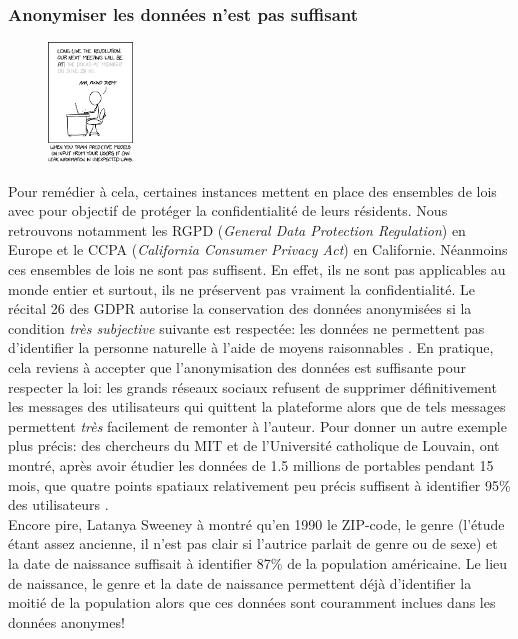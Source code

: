 \subsubsection{Anonymiser les données n'est pas suffisant}


\begin{figure}
    \centering
    \includegraphics[width=0.20\textwidth, clip]{"./proofs/source/predictive_models.png"}
\end{figure}


Pour remédier à cela, certaines instances mettent en place des ensembles de lois avec pour objectif de protéger la confidentialité de leurs résidents. Nous retrouvons notamment les RGPD (\textit{General Data Protection Regulation}) en Europe et le CCPA (\textit{California Consumer Privacy Act}) en Californie. Néanmoins ces ensembles de lois ne sont pas suffisent. En effet, ils ne sont pas applicables au monde entier et surtout, ils ne préservent pas vraiment la confidentialité. Le récital 26 des GDPR autorise la conservation des données anonymisées si la condition \textit{très subjective} suivante est respectée: les données ne permettent pas d'identifier la personne naturelle à l'aide de moyens raisonnables \cite{rec26}. En pratique, cela reviens à accepter que l'anonymisation des données est suffisante pour respecter la loi: les grands réseaux sociaux refusent de supprimer définitivement les messages des utilisateurs qui quittent la plateforme alors que de tels messages permettent \textit{très} facilement de remonter à l'auteur. Pour donner un autre exemple plus précis: des chercheurs du MIT et de l'Université catholique de Louvain, ont montré, après avoir étudier les données de 1.5 millions de portables pendant 15 mois, que quatre points spatiaux relativement peu précis suffisent à identifier 95\% des utilisateurs \cite{cell}.\\

Encore pire, {\sc Latanya Sweeney} à montré \cite{link} qu'en 1990 le ZIP-code, le genre (l'étude étant assez ancienne, il n'est pas clair si l'autrice parlait de genre ou de sexe) et la date de naissance suffisait à identifier 87\% de la population américaine. Le lieu de naissance, le genre et la date de naissance permettent déjà d'identifier la moitié de la population alors que ces données sont couramment inclues dans les données anonymes!


